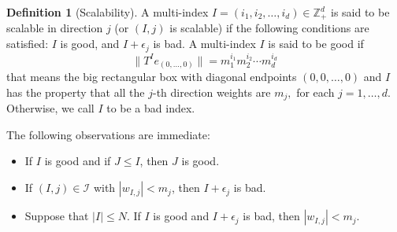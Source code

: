 \documentclass[12pt,reqno] {amsart}
\theoremstyle{remark}
\theoremstyle{definition}
\newtheorem{definition}[theorem]{Definition}%
\begin{document}
\begin{definition}[Scalability]
    A multi-index \( I = (i_1, i_2, \dots, i_d) \in \mathbb{Z}_+^d \) is said to be scalable in direction \( j \) (or \((I, j)\) is scalable) if the following conditions are satisfied: \( I \) is good, and \( I+\epsilon_j \) is bad.
A multi-index \( I \)  is said to be good if \[\|T^I e_{(0,\dots ,0)}\|=m_1^{i_1}m_2^{i_2}\cdots m_d^{i_d}\] that means the big rectangular box with diagonal endpoints \( (0, 0, \dots, 0) \) and \( I \) has the property that all the $j$-th direction weights are $m_j,$ for each $j=1,\ldots, d.$ 
Otherwise, we call \( I \) to be a bad index. 
\end{definition}

The following observations are immediate:
\begin{itemize}
    \item[(a)] If \( I \) is good and if \( J \leq I \), then \( J \) is good.
    \item[(b)] If \( (I, j) \in \mathcal{I} \) with \( |w_{I,j}| < m_j \), then \( I + \epsilon_j \) is bad.
    \item[(c)] Suppose that \( |I| \leq N \). If \( I \) is good and \( I + \epsilon_j \) is bad, then \( |w_{I,j}| < m_j \).
\end{itemize}
\end{document}
